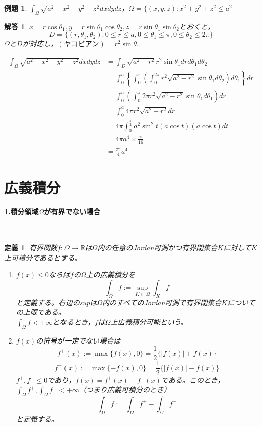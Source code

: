 \documentclass[dvipdfmx,a4j,10pt]{jsarticle}
\theoremstyle{mystyle1}
\newtheorem{dfn}{定義}[part]
\theoremstyle{mystyle2}
\newtheorem{ex}{例題}
\newtheorem{ans}{解答}
\begin{document}
\begin{ex}
	$\displaystyle \int_\Omega\sqrt{a^2-x^2-y^2-z^2}dxdydz$，$\Omega=\{(x,y,z):x^2+y^2+z^2\leq a^2$
\end{ex}

\begin{ans}
$x=r\cos\theta_1,y=r\sin\theta_1\cos\theta_2,z=r\sin\theta_1\sin\theta_2$とおくと，
\[
	D=\{(r,\theta_1,\theta_2):0\leq r\leq a,0\leq\theta_1\leq\pi,0\leq\theta_2\leq2\pi\}
\]
$\Omega$と$D$が対応し，$(ヤコビアン)=r^2\sin\theta_1$

\[
	\begin{split}
		\int_\Omega\sqrt{a^2-x^2-y^2-z^2}dxdydz
		&=\int_D\sqrt{a^2-r^2}r^2\sin\theta_1drd\theta_1d\theta_2 \\
		&=\int_0^a\left\{\int_0^\pi\left(\int_0^{2\pi}r^2\sqrt{a^2-r^2}\sin\theta_1d\theta_2\right)d\theta_1\right\}dr \\
		&=\int_0^a\left(\int_0^\pi 2\pi r^2\sqrt{a^2-r^2}\sin\theta_1d\theta_1\right)dr \\
		&=\int_0^a 4\pi r^2\sqrt{a^2-r^2}dr \\
		&= 4\pi\int_0^{\frac{\pi}{2}}a^2\sin^2 t(a\cos t)(a\cos t)dt\\
		&=4\pi a^4\times\frac{\pi}{16}\\
		&=\frac{\pi^2}{4}a^4
	\end{split}
\]
\end{ans}


\newpage


\section{広義積分}

\paragraph{1.積分領域$\Omega$が有界でない場合}
\
\begin{framed}
	\begin{dfn}\footnotemark
		有界関数$f:\Omega\to\mathbb{R}$は$\Omega$内の任意のJordan可測\footnotemark かつ有界閉集合$K$に対して$K$上可積分であるとする。
		\begin{enumerate}
			\item $f(x)\leq 0$ならば$f$の$\Omega$上の広義積分を
			\[
				\int_\Omega f := \sup_{K\subset\Omega}\int_K f
			\]
			と定義する。右辺のsupは$\Omega$内のすべてのJordan可測で有界閉集合$K$についての上限である。\\
			$\displaystyle\int_\Omega f<+\infty$となるとき，$f$は$\Omega$上広義積分可能という。
			\item $f(x)$の符号が一定でない場合は
			\[
			f^+(x):=\max\{f(x),0\}=\frac{1}{2}\{|f(x)|+f(x)\}
			\]
			\[
			f^-(x):=\max\{-f(x),0\}=\frac{1}{2}\{|f(x)|-f(x)\}
			\]
			$f^+,f^-\leq 0$であり，$f(x)=f^+(x)-f^-(x)$である。このとき，$\displaystyle\int_\Omega f^+,\int_\Omega f^- <+\infty$（つまり広義可積分のとき）
			\[
			\int_\Omega f := \int_\Omega f^+ - \int_\Omega f^-
			\]
			と定義する。
		\end{enumerate}
	\end{dfn}
\end{framed}
\end{document}
